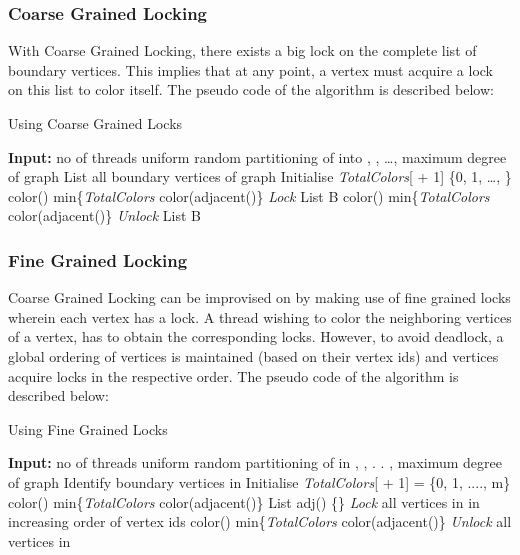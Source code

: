 \documentclass[a4paper,11pt]{article}
\begin{document}
\subsubsection{Coarse Grained Locking}
With Coarse Grained Locking, there exists a big lock on the complete list of boundary vertices. This implies that at any point, a vertex must acquire a lock on this list to color itself. The pseudo code of the algorithm is described below:


\begin{algorithm}
\caption{Using Coarse Grained Locks}
\label{alg2}

\begin{algorithmic}[1]
\State \textbf{Input:}   no of threads
\State uniform random partitioning of  into , , \dots, 
\State   maximum degree of graph
\State List   all boundary vertices of graph 
\State Initialise \textit{TotalColors}[ + 1]  \{0, 1, \dots, \}
\State color()  min\{\textit{TotalColors}  color(adjacent()\}
\EndFor
{}
\State \textit{Lock} List B
\State color()  min\{\textit{TotalColors}  color(adjacent()\}
\State \textit{Unlock} List B
\EndFor
\EndFor
\EndProcedure
\end{algorithmic}
\end{algorithm}

\subsubsection{Fine Grained Locking}
Coarse Grained Locking can be improvised on by making use of fine grained locks wherein each vertex has a lock. A thread wishing to color the neighboring vertices of a vertex, has to obtain the corresponding locks. However, to avoid deadlock, a global ordering of vertices is maintained (based on their vertex ids) and vertices acquire locks in the respective order. 
The pseudo code of the algorithm is described below:

\begin{algorithm}
\caption{Using Fine Grained Locks}
\label{alg3}

\begin{algorithmic}[1]
\State \textbf{Input:}   no of threads
\State uniform random partitioning of  in , , . . ,
\State   maximum degree of graph
\State Identify boundary vertices in 
\State Initialise \textit{TotalColors}[ + 1] = \{0, 1, ...., m\}
\State color()  min\{\textit{TotalColors}  color(adjacent()\}
\EndFor
{}
\State List   adj()
\State     \{\}
\State \textit{Lock} all vertices in  in increasing order of vertex ids
\State color()  min\{\textit{TotalColors}  color(adjacent()\}
\State \textit{Unlock} all vertices in 
\EndFor
\EndFor
\EndProcedure
\end{algorithmic}
\end{algorithm}
\vspace{-0.5cm}
\end{document}

